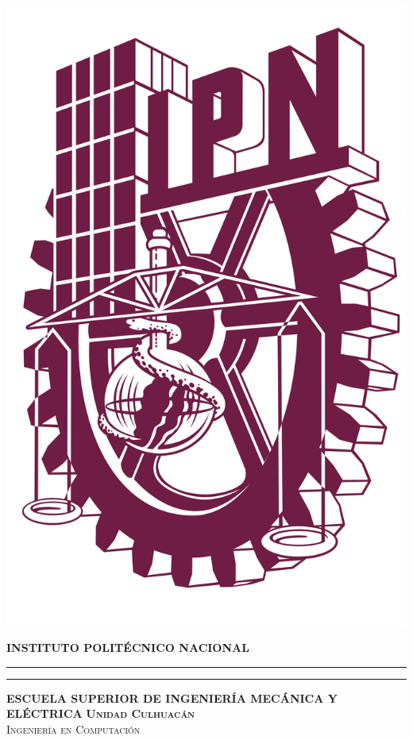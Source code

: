 \documentclass[12pt, twoside]{report}
\begin{document}

\thispagestyle{empty}
        \begin{minipage}[c][0.17\textheight][c]{0.22\textwidth}
	\begin{center}
        		\includegraphics[scale=0.25]{logo-ipn-guinda.png}
	\end{center}
        \end{minipage}
        \begin{minipage}[c][0.195\textheight][c]{0.71\textwidth}
            \begin{center}
                \vspace{0.3cm}
                \textbf{\textsc{\Large INSTITUTO POLIT\'ECNICO NACIONAL}}
                \vspace{0.4cm}
               \color{Black}\hrule height1pt
                \vspace{0.2cm}
               {\color{Black}\hrule height1pt}
                \vspace{0.4cm}
                \color{Black}\textbf{\textsc{ESCUELA SUPERIOR DE INGENIER\'IA MEC\'ANICA Y EL\'ECTRICA}}
                \textbf{\textsc{Unidad Culhuac\'an\\}}
                \textsc{Ingenier\'ia en Computaci\'on}\\[0.5cm] %
            \end{center}
        \end{minipage}
\end{document}
